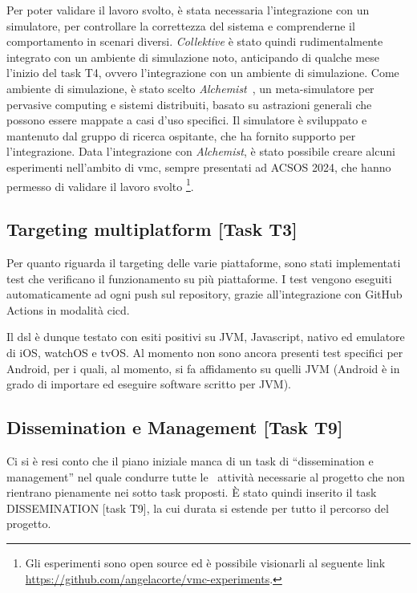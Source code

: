 \documentclass[13pt, a4paper]{article}
\newcommand{\ck}{\emph{Collektive}}
\begin{document}
Per poter validare il lavoro svolto, è stata necessaria l'integrazione con un simulatore,
    per controllare la correttezza del sistema e comprenderne il comportamento in scenari diversi.
%
\ck{} è stato quindi rudimentalmente integrato con un ambiente di simulazione noto,
anticipando di qualche mese l'inizio del task T4, ovvero l'integrazione con un ambiente di simulazione.
%
Come ambiente di simulazione, è stato scelto \emph{Alchemist}~\cite{PianiniJOS2013},
un meta-simulatore per pervasive computing e sistemi distribuiti,
basato su astrazioni generali che possono essere mappate a casi d'uso specifici.
%
Il simulatore è sviluppato e mantenuto dal gruppo di ricerca ospitante,
che ha fornito supporto per l'integrazione.
%
Data l'integrazione con \emph{Alchemist}, è stato possibile creare alcuni esperimenti nell'ambito di \ac{vmc},
    sempre presentati ad ACSOS 2024, che hanno permesso di validare il lavoro svolto \footnote{
    Gli esperimenti sono open source ed è possibile visionarli al seguente link \url{https://github.com/angelacorte/vmc-experiments}.
}.

\subsection{Targeting multiplatform [Task T3]}\label{subsec:task-t3-[targeting-multiplatform]}
Per quanto riguarda il targeting delle varie piattaforme,
    sono stati implementati test che verificano il funzionamento su più piattaforme.
%
I test vengono eseguiti automaticamente ad ogni push sul repository, grazie all'integrazione con GitHub Actions in modalità \ac{cicd}.

Il \ac{dsl} è dunque testato con esiti positivi su \ac{JVM}, Javascript, nativo ed emulatore di iOS, watchOS e tvOS.
%
Al momento non sono ancora presenti test specifici per Android,
per i quali, al momento,
si fa affidamento su quelli \ac{JVM}
(Android è in grado di importare ed eseguire software scritto per \ac{JVM}).

\subsection{Dissemination e Management [Task T9]}\label{subsec:dissemination-e-management-[task-t9]}
Ci si è resi conto che il piano iniziale manca di un task di ``dissemination e management'' nel quale condurre tutte le \
attività necessarie al progetto che non rientrano pienamente nei sotto task proposti.
%
È stato quindi inserito il task DISSEMINATION [task T9], la cui durata si estende per tutto il percorso del progetto.
\end{document}
